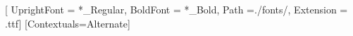 \usepackage{fontspec}

\newfontfamily{}[
	UprightFont = *_Regular,
	BoldFont = *_Bold,
	Path =./fonts/,
	Extension = .ttf]
\newfontface{}
\newfontface{}
\setmonofont{JuliaMono-Medium}[Contextuals=Alternate]


